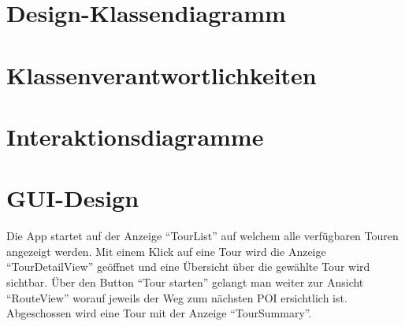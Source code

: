 \documentclass[a4paper,10pt,xetex]{article}
\begin{document}
\section{Design-Klassendiagramm}\label{design-klassendiagram}
\section{Klassenverantwortlichkeiten}\label{klassenverantwortlichkeiten}
\section{Interaktionsdiagramme}\label{interaktionsdiagramme}

\section{GUI-Design}\label{gui-design}
Die App startet auf der Anzeige ``TourList'' auf welchem alle verfügbaren Touren angezeigt
werden. Mit einem Klick auf eine Tour wird die Anzeige ``TourDetailView'' geöffnet und eine
Übersicht über die gewählte Tour wird sichtbar. Über den Button ``Tour starten'' gelangt
man weiter zur Ansicht ``RouteView'' worauf jeweils der Weg zum nächsten POI ersichtlich ist.
Abgeschossen wird eine Tour mit der Anzeige ``TourSummary''.

\newpage
\end{document}
